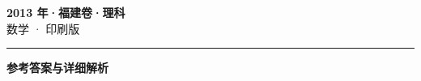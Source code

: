 \documentclass[zihao=5, a4paper]{ctexart}
\begin{document}
\begin{center}
  {\Large\bfseries 2013 年·福建卷·理科}\\[4pt]
  {\large 数学 · 印刷版}
\end{center}
\medskip
{}

\par\bigskip\hrule\bigskip
{}
\Needspace{0.55\textheight}
\begin{center}{\large\bfseries 参考答案与详细解析}\end{center}
\smallskip

\end{document}
